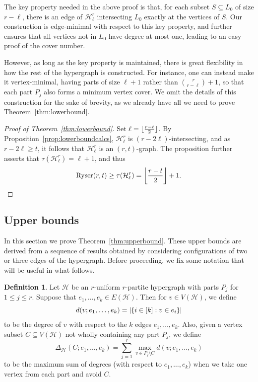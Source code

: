 \documentclass[a4paper,twoside,11pt]{article}
\DeclarePairedDelimiter{\floor}{\lfloor}{\rfloor}
\DeclarePairedDelimiter{\card}{|}{|}
\numberwithin{thm}{section}
\theoremstyle{definition}
\newtheorem{dfn}[thm]{Definition}
\theoremstyle{remark}
\theoremstyle{definition}
\def\cH{{\mathcal H}}
\newcommand{\m}[1]{\mathcal{#1}}
\DeclareMathOperator{\Ryser}{Ryser}
\begin{document}
The key property needed in the above proof is that, for each subset $S \subseteq L_0$ of size $r-\ell$, there is an edge of $\m H^r_\ell$ intersecting $L_0$ exactly at the vertices of $S$. Our construction is edge-minimal with respect to this key property, and further ensures that all vertices not in $L_0$ have degree at most one, leading to an easy proof of the cover number. 

However, as long as the key property is maintained, there is great flexibility in how the rest of the hypergraph is constructed.  For instance, one can instead make it vertex-minimal, having parts of size $\ell + 1$ rather than $\binom{r}{r-\ell} + 1$, so that each part $P_j$ also forms a minimum vertex cover. We omit the details of this construction for the sake of brevity, as we already have all we need to prove Theorem~\ref{thm:lowerbound}.

\begin{proof}[Proof of Theorem~\ref{thm:lowerbound}]
Set $\ell = \floor{\frac{r-t}{2}}$. By Proposition~\ref{prop:lowerboundcalcs}, $\m H^r_{\ell}$ is $(r - 2\ell)$-intersecting, and as $r - 2\ell \ge t$, it follows that $\m H^r_{\ell}$ is an $(r,t)$-graph.  The proposition further asserts that $\tau(\m H^r_{\ell}) = \ell + 1$, and thus
\[ \Ryser(r,t) \ge \tau(\m H^r_{\ell}) = \floor*{\frac{r-t}{2}} + 1. \qedhere \]
\end{proof}


\subsection{Upper bounds} \label{sec:upperboundproof}
In this section we prove Theorem~\ref{thm:upperbound}. %
These upper bounds are derived from a sequence of results obtained by considering configurations of two or three edges of the hypergraph. Before proceeding, we fix some notation that will be useful in what follows. 

\begin{dfn} \label{def:degreesums}
Let $\cH$ be an $r$-uniform $r$-partite hypergraph with parts $P_j$ for $1\leq j\leq r$. Suppose that $e_1,\ldots,e_k\in E(\cH)$. Then for   $v\in V(\cH)$, we define
\[d(v;e_1,\ldots,e_k)=\card{\{i\in[k]:v\in e_i\}}\]
to be the degree of $v$ with respect to the $k$ edges $e_1,\ldots , e_k$. Also, given a vertex subset $C\subseteq V(\cH)$ not wholly containing any part $P_j$, we define 
\[\Delta_\cH(C;e_1,\ldots,e_k) = \sum_{j=1}^r \max_{v\in P_j\setminus C}d(v;e_1,\ldots,e_k)\]
to be the maximum sum of degrees (with respect to $e_1,\ldots,e_k$) when we take one vertex from each part and avoid $C$.
\end{dfn}
\end{document}
